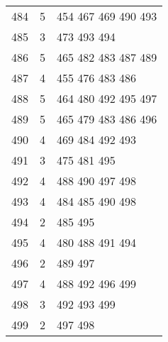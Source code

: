 \documentclass{standalone}
\begin{document}
\begin{tabular}{c c l}
484 & 5 & 454 467 469 490 493 \\
485 & 3 & 473 493 494 \\
486 & 5 & 465 482 483 487 489 \\
487 & 4 & 455 476 483 486 \\
488 & 5 & 464 480 492 495 497 \\
489 & 5 & 465 479 483 486 496 \\
490 & 4 & 469 484 492 493 \\
491 & 3 & 475 481 495 \\
492 & 4 & 488 490 497 498 \\
493 & 4 & 484 485 490 498 \\
494 & 2 & 485 495 \\
495 & 4 & 480 488 491 494 \\
496 & 2 & 489 497 \\
497 & 4 & 488 492 496 499 \\
498 & 3 & 492 493 499 \\
499 & 2 & 497 498 \\
\end{tabular}
\end{document}
